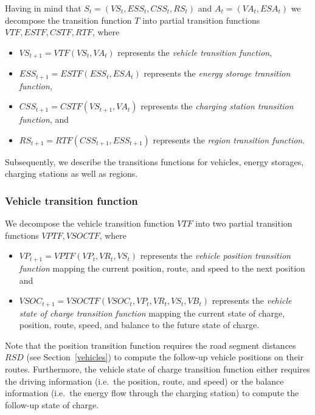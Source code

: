 Having in mind that $S_t = (VS_t, ESS_t, CSS_t, RS_t)$ and $A_t = (VA_t, ESA_t)$ we decompose the transition function $T$ into partial transition functions $VTF,ESTF,CSTF,RTF$, where
\begin{itemize}
	\item $VS_{t+1} = VTF(VS_t, VA_t)$ represents the \textit{vehicle transition function},
	\item $ESS_{t+1} = ESTF(ESS_t, ESA_t)$ represents the \textit{energy storage transition function},
	\item $CSS_{t+1} = CSTF(VS_{t+1}, VA_t)$ represents the \textit{charging station transition function}, and
	\item $RS_{t+1} = RTF(CSS_{t+1}, ESS_{t+1})$ represents the \textit{region transition function}.
\end{itemize}
Subsequently, we describe the transitions functions for vehicles, energy storages, charging stations as well as regions.  

\subsubsection{Vehicle transition function}
\label{transitions_vehicles}

We decompose the vehicle transition function $VTF$ into two partial transition functions $VPTF,VSOCTF$, where
\begin{itemize}
	\item $VP_{t+1} = VPTF(VP_t, VR_t, VS_t)$ represents the \textit{vehicle position transition function} mapping the current position, route, and speed to the next position and
	\item $VSOC_{t+1} = VSOCTF(VSOC_t, VP_t, VR_t, VS_t, VB_t)$ represents the \textit{vehicle state of charge transition function} mapping the current state of charge, position, route, speed, and balance to the future state of charge.
\end{itemize}
Note that the position transition function requires the road segment distances $RSD$ (see Section~\ref{vehicles}) to compute the follow-up vehicle positions on their routes. Furthermore, the vehicle state of charge transition function either requires the driving information (i.e.\ the position, route, and speed) or the balance information (i.e.\ the energy flow through the charging station) to compute the follow-up state of charge.

